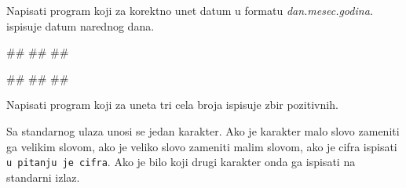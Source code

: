 \begin{Exercise}[label=p1.2_] 
 Napisati program koji za korektno unet datum u formatu \textit{dan.mesec.godina.} ispisuje datum narednog dana.\\
\begin{miditest}
\begin{upotreba}{1}
#\naslovInt#
##
##
\end{upotreba}
\end{miditest}
\begin{miditest}
\begin{upotreba}{2}
#\naslovInt#
##
##
\end{upotreba}
\end{miditest}
\end{Exercise}
\begin{Answer}[ref=p1.2_]
\end{Answer}

\begin{Exercise}[label=p1.3_] 
Napisati program koji za uneta tri cela broja ispisuje zbir pozitivnih.  
\end{Exercise}
\begin{Answer}[ref=p1.3_]
\end{Answer}

\begin{Exercise}[label=p1.4_] 
Sa standarnog ulaza unosi se jedan karakter. Ako je karakter malo
slovo zameniti ga velikim slovom, ako je veliko slovo zameniti malim
slovom, ako je cifra ispisati \verb|u pitanju je cifra|. Ako je bilo
koji drugi karakter onda ga ispisati na standarni izlaz.
\end{Exercise}
\begin{Answer}[ref=p1.4_]
\end{Answer}

